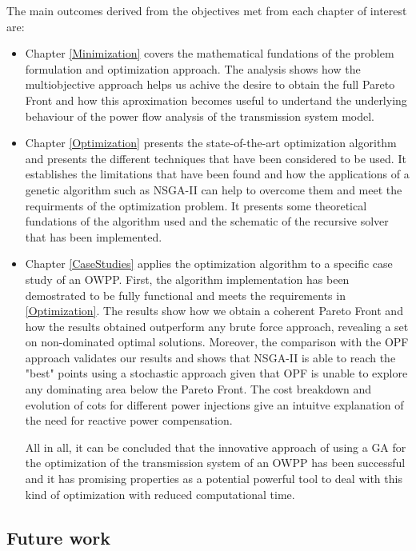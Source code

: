 \documentclass[a4paper,11pt, titlepage, twoside]{article}
\begin{document}
The main outcomes derived from the objectives met from each chapter of interest are:
\begin{itemize}
    \item Chapter \ref{Minimization} covers the  mathematical fundations of the problem formulation and optimization approach. The analysis shows how the multiobjective approach helps us achive
    the desire to obtain the full Pareto Front and how this aproximation becomes useful to undertand the underlying behaviour of the power flow analysis of the transmission system model.

    \item Chapter \ref{Optimization} presents the state-of-the-art optimization algorithm and presents the different techniques that have been considered to be used.
    It establishes the limitations that have been found and how the applications of a genetic algorithm such as NSGA-II
    can help to overcome them and meet the requirments of the optimization problem. It presents some theoretical fundations of the algorithm used and the schematic of the recursive solver that has been implemented.

    \item Chapter \ref{CaseStudies} applies the optimization algorithm to a specific case study of an OWPP. First, the algorithm implementation has been demostrated to be fully functional and meets the requirements in \ref{Optimization}.
    The results show how we obtain a coherent Pareto Front and how the results obtained outperform any brute force approach, revealing a set on non-dominated optimal solutions. Moreover, the comparison with the OPF approach validates our results and shows that
    NSGA-II is able to reach the "best" points using a stochastic approach given that OPF is unable to explore any dominating area below the Pareto Front. The cost breakdown and evolution of cots for different power injections give an intuitve 
    explanation of the need for reactive power compensation.\par
    All in all, it can be concluded that the innovative approach of using a GA for the optimization of the transmission system of an OWPP has been successful and it has promising properties as a potential powerful tool to deal with this kind of optimization
    with reduced computational time.

\end{itemize}

\subsection{Future work}\label{futurework}
\end{document}
